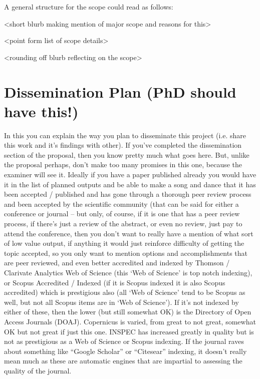 A general structure for the scope could read as follows:

 <short blurb making mention of major scope and reasons for this>
 
 <point form list of scope details>
 
 <rounding off blurb reflecting on the scope>
 
\section{Dissemination Plan (PhD should have this!)}

In this you can explain the way you plan to disseminate this project (i.e. share this work and it’s findings with other). If you’ve completed the dissemination section of the proposal, then you know pretty much what goes here. But, unlike the proposal perhaps, don’t make too many promises in this one, because the examiner will see it. Ideally if you have a paper published already you would have it in the list of planned outputs and be able to make a song and dance that it has been accepted / published and has gone through a thorough peer review process and been accepted by the scientific community (that can be said for either a conference or journal – but only, of course, if it is one that has a peer review process, if there’s just a review of the abstract, or even no review, just pay to attend the conference, then you don’t want to really have a mention of what sort of low value output, if anything it would just reinforce difficulty of getting the topic accepted, so you only want to mention options and accomplishments that are peer reviewed, and even better accredited and indexed by Thomson / Clarivate Analytics Web of Science (this ‘Web of Science’ is top notch indexing), or Scopus Accredited / Indexed (if it is Scopus indexed it is also Scopus accredited) which is prestigious also (all ‘Web of Science’ tend to be Scopus as well, but not all Scopus items are in ‘Web of Science’). If it’s not indexed by either of these, then the lower (but still somewhat OK) is the Directory of Open Access Journals (DOAJ). Copernicus is varied, from great to not great, somewhat OK but not great if just this one. INSPEC has increased greatly in quality but is not as prestigious as a Web of Science or Scopus indexing.  If the journal raves about something like ``Google Scholar'' or ``Citesear'' indexing, it doesn’t really mean much as these are automatic engines that are impartial to assessing the quality of the journal.

